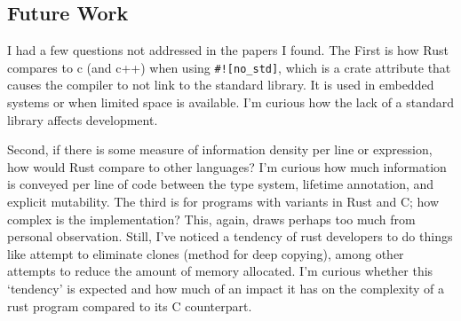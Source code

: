 \documentclass[conference]{IEEEtran}
\begin{document}
\subsection{Future Work}

I had a few questions not addressed in the papers I found. The First is how Rust compares to c (and c++) when using \texttt{\#![no\_std]}, which is a crate attribute that causes the compiler to not link to the standard library. It is used in embedded systems or when limited space is available. I'm curious how the lack of a standard library affects development.

Second, if there is some measure of information density per line or expression, how would Rust compare to other languages? I'm curious how much information is conveyed per line of code between the type system, lifetime annotation, and explicit mutability. The third is for programs with variants in Rust and C; how complex is the implementation? This, again, draws perhaps too much from personal observation. Still, I've noticed a tendency of rust developers to do things like attempt to eliminate clones (method for deep copying),
among other attempts to reduce the amount of memory allocated. I'm curious whether this `tendency' is expected and how much of an impact it has on the complexity of
a rust program compared to its C counterpart.



\end{document}
